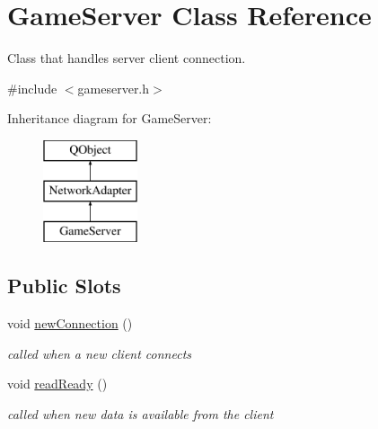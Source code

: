 \hypertarget{class_game_server}{\section{Game\-Server Class Reference}
\label{class_game_server}
}


Class that handles server client connection.  




{\ttfamily \#include $<$gameserver.\-h$>$}

Inheritance diagram for Game\-Server\-:\begin{figure}[H]
\begin{center}
\leavevmode
\includegraphics[height=3.000000cm]{class_game_server}
\end{center}
\end{figure}
\subsection*{Public Slots}
\begin{DoxyCompactItemize}
\item 
\hypertarget{class_game_server_ae41954b45bd6e4f7cff0b9c9034206cc}{void \hyperlink{class_game_server_ae41954b45bd6e4f7cff0b9c9034206cc}{new\-Connection} ()}\label{class_game_server_ae41954b45bd6e4f7cff0b9c9034206cc}

\begin{DoxyCompactList}\small\item\em called when a new client connects \end{DoxyCompactList}\item 
\hypertarget{class_game_server_ae04551b358465ca81a34073abb7d6380}{void \hyperlink{class_game_server_ae04551b358465ca81a34073abb7d6380}{read\-Ready} ()}\label{class_game_server_ae04551b358465ca81a34073abb7d6380}

\begin{DoxyCompactList}\small\item\em called when new data is available from the client \end{DoxyCompactList}\end{DoxyCompactItemize}
